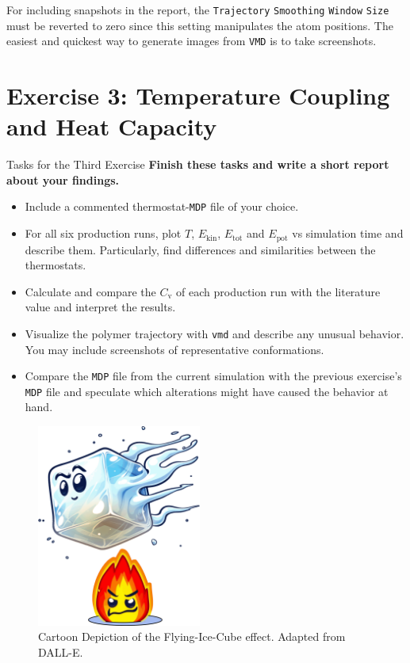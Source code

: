 \documentclass[9pt,tutorial]{livecoms}
\newcommand{\code}[1]{\colorbox{light-gray}{\texttt{#1}}}
\begin{document}
For including snapshots in the report, the \code{Trajectory} \code{Smoothing} \code{Window} \code{Size} must be reverted to zero since this setting manipulates the atom positions. The easiest and quickest way to generate images from \texttt{VMD} is to take screenshots.

\newpage

\section{Exercise 3: Temperature Coupling and Heat Capacity}\label{sec:tcoupling}
\begin{Checklists}
    \begin{checklist}{Tasks for the Third Exercise}
    \textbf{Finish these tasks and write a short report about your findings.}
    \begin{itemize}
		\item Include a commented thermostat-\texttt{MDP} file of your choice.
		\item For all six production runs, plot $T$, $E_\text{kin}$, $E_\text{tot}$ and $E_\text{pot}$ vs simulation time and describe them. Particularly, find differences and similarities between the thermostats.
		\item Calculate and compare the $C_\text{v}$ of each production run with the literature value and interpret the results.
		\item Visualize the polymer trajectory with \texttt{vmd} and describe any unusual behavior. You may include screenshots of representative conformations. 
		\item Compare the \texttt{MDP} file from the current simulation with the previous exercise's \texttt{MDP} file and speculate which alterations might have caused the behavior at hand.
	\end{itemize} 
\end{checklist}
\end{Checklists}
\begin{figure}[H]
    \centering
    \includegraphics[width=0.48\textwidth]{figures/Flying-Ice-Cube.png}
    \caption{Cartoon Depiction of the Flying-Ice-Cube effect. Adapted from DALL-E.}
    \label{fig:Flying-Ice-Cube}
\end{figure}
\end{document}
